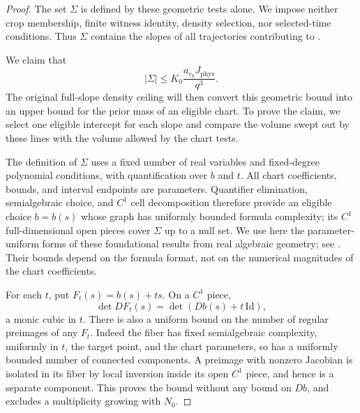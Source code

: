 \begin{proof}
The set \(\Sigma\) is defined by these geometric tests alone.
We impose neither crop membership, finite witness identity, density
selection, nor selected-time conditions. Thus \(\Sigma\) contains
the slopes of all trajectories contributing to
.

We claim that
\begin{equation}
 |\Sigma|\le K_0\frac{a_{r_0}J_{\mathrm{phys}}}{q^3}.
 \label{a01:eligible-slope-volume}
\end{equation}
The original full-slope density ceiling will then convert this
geometric bound into an upper bound for the prior mass of an
eligible chart. To prove the claim, we select one eligible
intercept for each slope and compare the volume swept out by
these lines with the volume allowed by the chart tests.

The definition of \(\Sigma\) uses a fixed number of
real variables and fixed-degree polynomial conditions,
with quantification over \(b\) and \(t\).
All chart coefficients, bounds, and interval endpoints
are parameters.
Quantifier elimination, semialgebraic choice, and
\(C^1\) cell decomposition therefore provide an
eligible choice \(b=b(s)\) whose graph has uniformly
bounded formula complexity; its \(C^1\) full-dimensional
open pieces cover \(\Sigma\) up to a null set.
We use here the parameter-uniform forms of these
foundational results from real algebraic geometry;
see \citep{BasuPollackRoy}.
Their bounds depend on the formula format, not on
the numerical magnitudes of the chart coefficients.

For each \(t\), put \(F_t(s)=b(s)+ts\).
On a \(C^1\) piece,
\begin{equation}
 \det DF_t(s)=\det(Db(s)+t\,\mathrm{Id}),
 \label{a01:monic-jacobian}
\end{equation}
a monic cubic in \(t\).
There is also a uniform bound on the number of regular
preimages of any \(F_t\).
Indeed the fiber has fixed semialgebraic complexity,
uniformly in \(t\), the target point, and the chart
parameters, so has a uniformly bounded number of
connected components.  A preimage with nonzero
Jacobian is isolated in its fiber by local inversion
inside its open \(C^1\) piece, and hence is a separate
component.  This proves the bound without any bound
on \(Db\), and excludes a multiplicity growing with
\(N_0\).


\end{proof}
